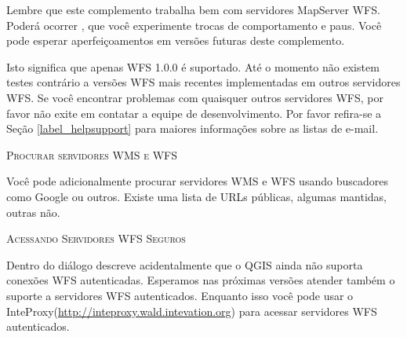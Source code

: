 Lembre que este complemento trabalha bem com servidores MapServer WFS. Poderá ocorrer , que você experimente trocas de comportamento e paus. Você pode esperar aperfeiçoamentos em versões futuras deste complemento.

Isto significa que apenas WFS 1.0.0 é suportado. Até o momento não existem testes contrário a versões WFS mais recentes implementadas em outros servidores WFS. Se você encontrar problemas com quaisquer outros servidores WFS, por favor não exite em contatar a equipe de desenvolvimento. Por favor refira-se a Seção \ref{label_helpsupport} para maiores informações sobre as listas de e-mail.

\begin{Tip}[ht]\caption{\textsc{Procurar servidores WMS e WFS}}
Você pode adicionalmente procurar servidores WMS e WFS usando buscadores como Google ou outros. Existe uma lista de URLs públicas, algumas mantidas, outras não.
\end{Tip} 

\begin{Tip}[ht]\caption{\textsc{Acessando Servidores WFS Seguros}}
Dentro do diálogo  descreve acidentalmente que o QGIS ainda não suporta conexões WFS autenticadas. Esperamos nas próximas versões atender também o suporte a servidores WFS autenticados. Enquanto isso você pode usar o InteProxy(\url{http://inteproxy.wald.intevation.org}) para acessar servidores WFS autenticados.
\end{Tip} 

